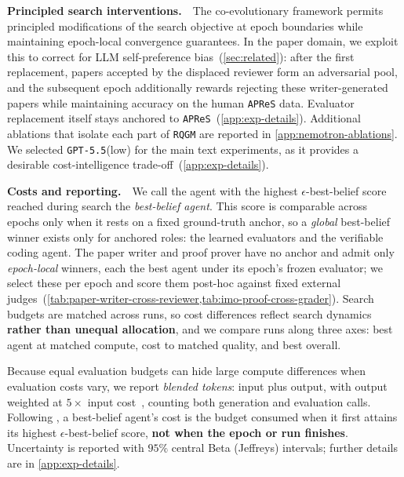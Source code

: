 \documentclass{paper}
\newcommand{\ourmethod}{\texttt{RQGM}\xspace}
\newcommand{\gptlow}{\texttt{GPT-5.5}\xspace}
\newcommand{\apres}{\texttt{APReS}\xspace}
\begin{document}
\noindent\textbf{Principled search interventions.}~~The co-evolutionary framework permits principled modifications of the search objective at epoch boundaries while maintaining epoch-local convergence guarantees. In the paper domain, we exploit this to correct for LLM self-preference bias~(\cref{sec:related}): after the first replacement, papers accepted by the displaced reviewer form an adversarial pool, and the subsequent epoch additionally rewards rejecting these writer-generated papers while maintaining accuracy on the human \apres data. Evaluator replacement itself stays anchored to \apres~(\cref{app:exp-details}). Additional ablations that isolate each part of \ourmethod are reported in \cref{app:nemotron-ablations}. We selected \gptlow (low) for the main text experiments, as it provides a desirable cost-intelligence trade-off~(\cref{app:exp-details}). 

\noindent\textbf{Costs and reporting.}~~We call the agent with the highest $\epsilon$-best-belief score reached during search the \emph{best-belief agent}. This score is comparable across epochs only when it rests on a fixed ground-truth anchor, so a \emph{global} best-belief winner exists only for anchored roles: the learned evaluators and the verifiable coding agent. The paper writer and proof prover have no anchor and admit only \emph{epoch-local} winners, each the best agent under its epoch's frozen evaluator; we select these per epoch and score them post-hoc against fixed external judges~(\cref{tab:paper-writer-cross-reviewer,tab:imo-proof-cross-grader}). Search budgets are matched across runs, so cost differences reflect search dynamics \textbf{rather than unequal allocation}, and we compare runs along three axes: best agent at matched compute, cost to matched quality, and best overall.

Because equal evaluation budgets can hide large compute differences when evaluation costs vary, we report \emph{blended tokens}: input plus output, with output weighted at $5\times$ input cost~\citep{openai2026pricing,anthropic2026pricing}, counting both generation and evaluation calls. Following \citet{wang2025huxley}, a best-belief agent's cost is the budget consumed when it first attains its highest $\epsilon$-best-belief score, \textbf{not when the epoch or run finishes}. Uncertainty is reported with $95\%$ central Beta (Jeffreys) intervals; further details are in \cref{app:exp-details}.
\end{document}

